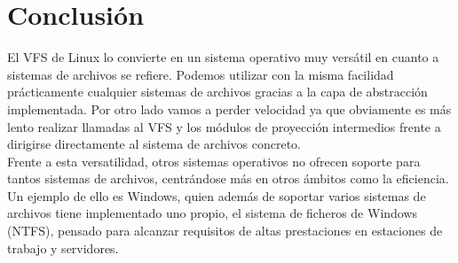 \documentclass[11pt,a4paper]{article}
\newcommand\tab[1][1cm]{\hspace*{#1}}
\begin{document}
\section{Conclusión}

\tab El VFS de Linux lo convierte en un sistema operativo muy versátil en cuanto a sistemas de archivos se refiere. Podemos utilizar con la misma facilidad prácticamente cualquier sistemas de archivos gracias a la capa de abstracción implementada. Por otro lado vamos a perder velocidad ya que obviamente es más lento realizar llamadas al VFS y los módulos de proyección intermedios frente a dirigirse directamente al sistema de archivos concreto. \cite{carretero} \\

\tab Frente a esta versatilidad, otros sistemas operativos no ofrecen soporte para tantos sistemas de archivos, centrándose más en otros ámbitos como la eficiencia. Un ejemplo de ello es Windows, quien además de soportar varios sistemas de archivos tiene implementado uno propio, el sistema de ficheros de Windows (NTFS), pensado para alcanzar requisitos de altas prestaciones en estaciones de trabajo y servidores. \cite{stalling} \\ 



\end{document}
